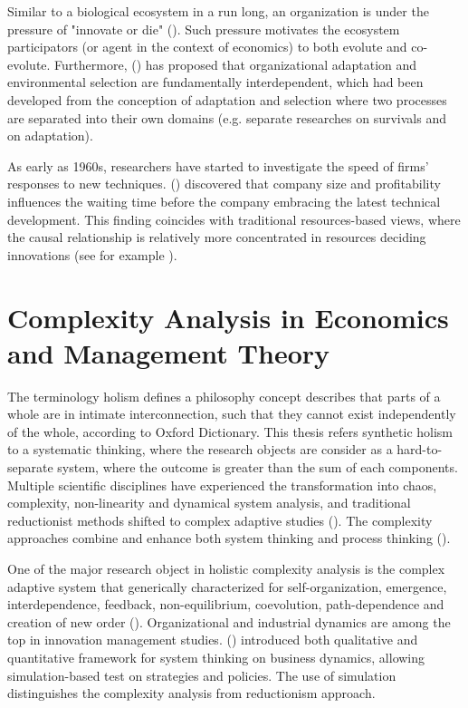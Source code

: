 \documentclass[utf8,english]{gradu3}
\begin{document}
Similar to a biological ecosystem in a run long, an organization is under the pressure of "innovate or die" (\cite{drucker1999knowledge}). Such pressure motivates the ecosystem participators (or agent in the context of economics) to both evolute and co-evolute. Furthermore, \citeauthor{levinthal1991organizational} (\citeyear{levinthal1991organizational}) has proposed that organizational adaptation and environmental selection are fundamentally interdependent, which had been developed from the conception of adaptation and selection where two processes are separated into their own domains (e.g. separate researches on survivals and on adaptation).

As early as 1960s, researchers have started to investigate the speed of firms' responses to new techniques. \citeauthor{mansfield1963speed} (\citeyear{mansfield1963speed}) discovered that company size and profitability influences the waiting time before the company embracing the latest technical development. This finding coincides with traditional resources-based views, where the causal relationship is relatively more concentrated in resources deciding innovations (see for example \cite{wernerfelt1984resource}).

\section{Complexity Analysis in Economics and Management Theory}

The terminology holism defines a philosophy concept describes that parts of a whole are in intimate interconnection, such that they cannot exist independently of the whole, according to Oxford Dictionary. This thesis refers synthetic holism to a systematic thinking, where the research objects are consider as a hard-to-separate system, where the outcome is greater than the sum of each components. Multiple scientific disciplines have experienced the transformation into chaos, complexity, non-linearity and dynamical system analysis, and traditional reductionist methods shifted to complex adaptive studies (\cite{urry2005complexity}). The complexity approaches combine and enhance both system thinking and process thinking (\cite{thrift1999place}). 

One of the major research object in holistic complexity analysis is the complex adaptive system that generically characterized for self-organization, emergence, interdependence, feedback, non-equilibrium, coevolution, path-dependence and creation of new order (\cite{mitleton2003complex}). Organizational and industrial dynamics are among the top in innovation management studies. \citeauthor{jung2014structure} (\citeyear{jung2014structure}) introduced both qualitative and quantitative framework for system thinking on business dynamics, allowing simulation-based test on strategies and policies. The use of simulation distinguishes the complexity analysis from reductionism approach.
\end{document}
